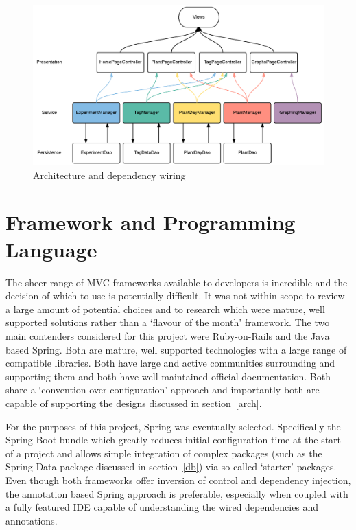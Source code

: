 \begin{figure}[H]
    \centering
    \includegraphics[width=\textwidth]{images/design/arch1}
    \caption{Architecture and dependency wiring}
    \label{fig:arch1}
\end{figure}

\section{Framework and Programming Language}\label{framework}

The sheer range of MVC frameworks available to developers is incredible and the decision of which to use is potentially difficult. It was not within scope to review a large amount of potential choices and to research which were mature, well supported solutions rather than a `flavour of the month' framework. The two main contenders considered for this project were Ruby-on-Rails and the Java based Spring. Both are mature, well supported technologies with a large range of compatible libraries. Both have large and active communities surrounding and supporting them and both have well maintained official documentation. Both share a  `convention over configuration' approach and importantly both are capable of supporting the designs discussed in section~\ref{arch}.

For the purposes of this project, Spring was eventually selected. Specifically the Spring Boot\cite{_boot} bundle which greatly reduces initial configuration time at the start of a project and allows simple integration of complex packages (such as the Spring-Data package discussed in section~\ref{db}) via so called `starter' packages. Even though both frameworks offer inversion of control and dependency injection, the annotation based Spring approach is preferable, especially when coupled with a fully featured IDE capable of understanding the wired dependencies and annotations. 

